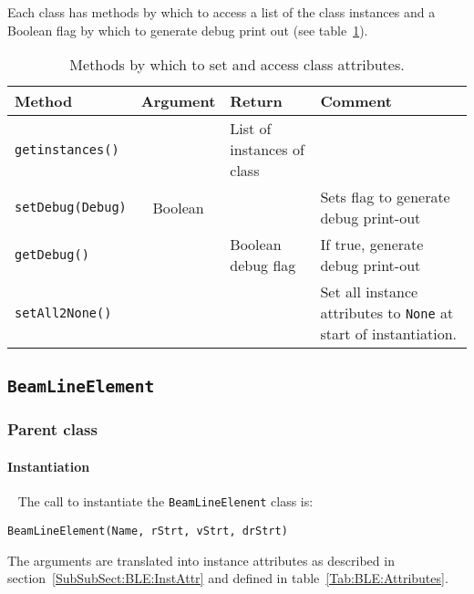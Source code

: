 Each class has methods by which to access a list of the class
instances and a Boolean flag by which to generate debug print out (see
table~\ref{Tab:ClassAttributeAccess}).
\begin{table}[h]
  \caption{Methods by which to set and access class attributes.}
  \label{Tab:ClassAttributeAccess}
  \begin{center}
    \begin{tabular}{|l|c|l|p{7cm}|}
      \hline
      \textbf{Method}          & \textbf{Argument} & \textbf{Return}            & \textbf{Comment}                      \\
      \hline
      \texttt{getinstances()}  &                   & List of instances of class &                                       \\
      \texttt{setDebug(Debug)} & Boolean           &                            & Sets flag to generate debug print-out \\
      \texttt{getDebug()}      &                   & Boolean debug flag         & If true, generate debug print-out     \\
      \texttt{setAll2None()}   &                   &                            & Set all instance attributes to \texttt{None} at start of instantiation. \\
      \hline
    \end{tabular}
  \end{center}
\end{table}

\subsection{\texttt{BeamLineElement}}

\subsubsection{Parent class}

\paragraph{Instantiation} ~\newline
\noindent
The call to instantiate the \texttt{BeamLineElenent} class is:
\begin{center}
  \texttt{BeamLineElement(Name, rStrt, vStrt, drStrt)}
\end{center}
The arguments are translated into instance attributes as described in
section~\ref{SubSubSect:BLE:InstAttr} and defined in
table~\ref{Tab:BLE:Attributes}.

